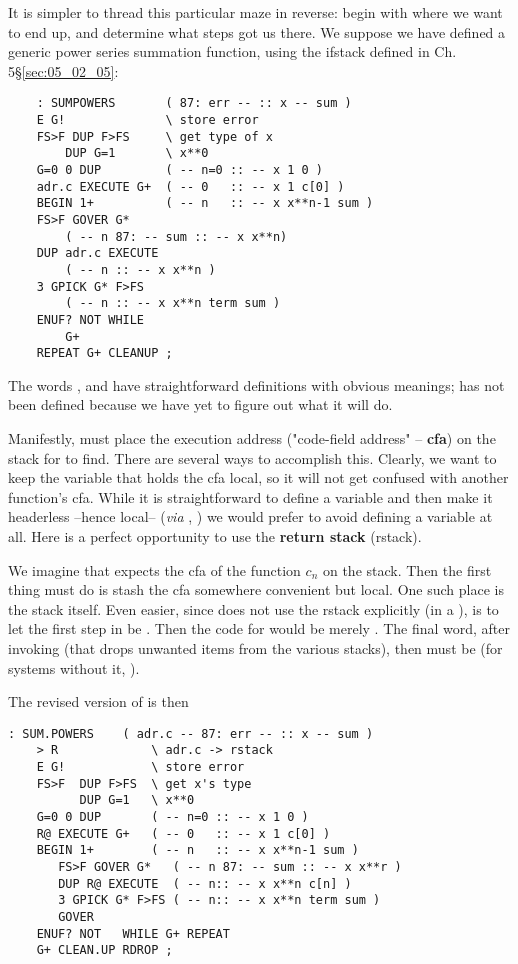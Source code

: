 It is simpler to thread this particular maze in reverse: begin with where we want to end up, and determine what steps got us there. We suppose we have defined a generic power series summation function, using the ifstack defined in Ch. 5\S\ref{sec:05_02_05}:
\begin{lstlisting}
    : SUMPOWERS       ( 87: err -- :: x -- sum )
    E G!              \ store error
    FS>F DUP F>FS     \ get type of x
        DUP G=1       \ x**0
    G=0 0 DUP         ( -- n=0 :: -- x 1 0 )
    adr.c EXECUTE G+  ( -- 0   :: -- x 1 c[0] )
    BEGIN 1+          ( -- n   :: -- x x**n-1 sum )
    FS>F GOVER G*
        ( -- n 87: -- sum :: -- x x**n)
    DUP adr.c EXECUTE
        ( -- n :: -- x x**n )
    3 GPICK G* F>FS
        ( -- n :: -- x x**n term sum )
    ENUF? NOT WHILE
        G+
    REPEAT G+ CLEANUP ;
\end{lstlisting}

The words ,  and  have straightforward definitions with obvious meanings;  has not been defined because we have yet to figure out what it will do.

Manifestly,  must place the execution address ("code-field address" -- \textbf{cfa}) on the stack for  to find. There are several ways to accomplish this. Clearly, we want to keep the variable that holds the cfa local, so it will not get confused with another function's cfa. While it is straightforward to define a variable and then make it headerless --hence local-- (\textit{via} , \eg) we would prefer to avoid defining a variable at all. Here is a perfect opportunity to use the \textbf{return stack} (rstack).

We imagine that  expects the cfa of the function $c_n$ on the stack. Then the first thing  must do is stash the cfa somewhere convenient but local. One such place is the stack itself. Even easier, since  does not use the rstack explicitly (\eg in a ), is to let the first step in  be . Then the code for  would be merely . The final word, after invoking  (that drops unwanted items from the various stacks), then must be  (for systems without it,  ).

The revised version of  is then
\begin{lstlisting}
: SUM.POWERS    ( adr.c -- 87: err -- :: x -- sum )
    > R             \ adr.c -> rstack
    E G!            \ store error
    FS>F  DUP F>FS  \ get x's type
          DUP G=1   \ x**0
    G=0 0 DUP       ( -- n=0 :: -- x 1 0 )
    R@ EXECUTE G+   ( -- 0   :: -- x 1 c[0] )
    BEGIN 1+        ( -- n   :: -- x x**n-1 sum )
       FS>F GOVER G*   ( -- n 87: -- sum :: -- x x**r )
       DUP R@ EXECUTE  ( -- n:: -- x x**n c[n] )
       3 GPICK G* F>FS ( -- n:: -- x x**n term sum )
       GOVER
    ENUF? NOT   WHILE G+ REPEAT
    G+ CLEAN.UP RDROP ;
\end{lstlisting}

